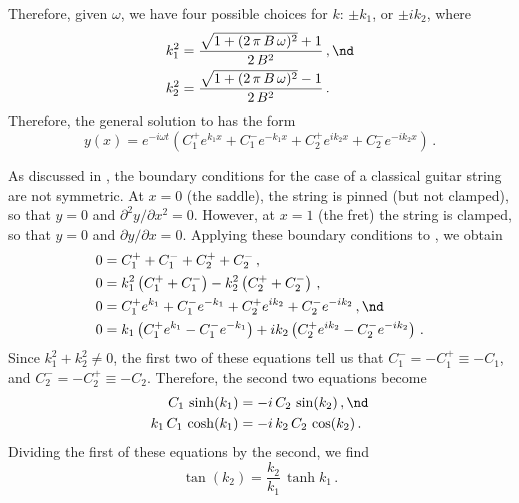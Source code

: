 Therefore, given $\omega$, we have four possible choices for $k$: $\pm k_1$, or $\pm i k_2$, where
 \begin{subequations} \label{eqn:disp_eqns}
 \begin{align}
\label{eqn:disp_eqn_1} k_1^2 &= \frac{\sqrt{1 + (2\, \pi\, B\, \omega)^2} + 1}{2\, B^2}\, , \nd \\
\label{eqn:disp_eqn_2} k_2^2 &= \frac{\sqrt{1 + (2\, \pi\, B\, \omega)^2} - 1}{2\, B^2}\, .
 \end{align}
 \end{subequations}
Therefore, the general solution to  has the form
 \begin{equation} \label{eqn:soln_dim}
y(x) = e^{-i \omega t} \left( C_1^+ e^{k_1 x} + C_1^- e^{-k_1 x} + C_2^+ e^{i k_2 x} + C_2^- e^{-i k_2 x} \right)\, .
 \end{equation}

As discussed in , the boundary conditions for the case of a classical guitar string are not symmetric. At $x = 0$ (the saddle), the string is pinned (but not clamped), so that $y = 0$ and $\partial^2 y/\partial x^2 = 0$. However, at $x = 1$ (the fret) the string is clamped, so that $y = 0$ and $\partial y/\partial x = 0$. Applying these boundary conditions to , we obtain
 \begin{subequations}
 \begin{align}
  0 &= C_1^+ + C_1^- + C_2^+ + C_2^-\, , \\
  0 &= k_1^2 \left(C_1^+ + C_1^-\right) - k_2^2 \left(C_2^+ + C_2^-\right)\, , \\
  0 &= C_1^+ e^{k_1} + C_1^- e^{-k_1} + C_2^+ e^{i k_2} + C_2^- e^{-i k_2}\, , \nd \\
  0 &= k_1 \left(C_1^+ e^{k_1} - C_1^- e^{-k_1}\right) + i k_2 \left(C_2^+ e^{i k_2} - C_2^- e^{-i k_2}\right)\, .
 \end{align}
 \end{subequations}
Since $k_1^2 + k_2^2 \ne 0$, the first two of these equations tell us that $C_1^- = -C_1^+ \equiv -C_1$, and $C_2^- = -C_2^+ \equiv -C_2$. Therefore, the second two equations become
 \begin{subequations}
 \begin{align}
C_1\, \sinh(k_1) &= - i\, C_2\, \sin(k_2)\, , \nd \\
k_1\, C_1\, \cosh(k_1) &= -i\, k_2\, C_2\, \cos(k_2)\, .
 \end{align}
 \end{subequations}
Dividing the first of these equations by the second, we find
 \begin{equation}
\tan(k_2) = \frac{k_2}{k_1}\, \tanh{k_1}\, .
 \end{equation}

